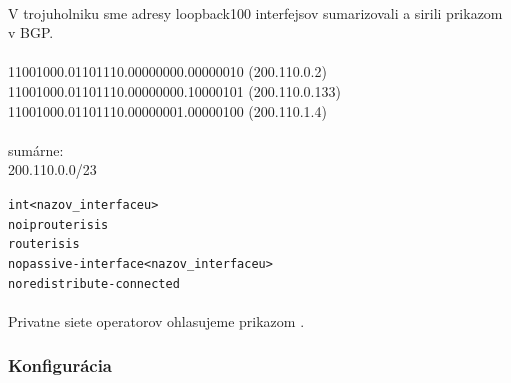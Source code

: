 \documentclass[12pt,twoside,a4paper]{report}
\begin{document}
\paragraph{}
V trojuholniku sme adresy loopback100 interfejsov sumarizovali a sirili  prikazom v BGP.\\\\
11001000.01101110.00000000.00000010 (200.110.0.2)\\
11001000.01101110.00000000.10000101 (200.110.0.133)\\
11001000.01101110.00000001.00000100 (200.110.1.4)\\
\\
sumárne:\\
200.110.0.0/23\\


\noindent
{\selectfont
\begin{small}
\begin{alltt}
int <nazov_interfaceu>
  no ip router isis
router isis
  no passive-interface <nazov_interfaceu>
  no redistribute-connected
\end{alltt}
\end{small}
}

\paragraph{}
Privatne siete operatorov ohlasujeme prikazom .

\subsubsection{Konfigurácia}
\end{document}

